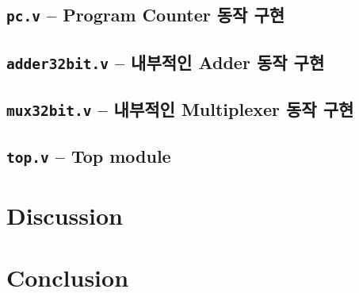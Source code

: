 \documentclass{scrartcl}
\begin{document}
\subsection{\texttt{pc.v} -- Program Counter 동작 구현}

\subsection{\texttt{adder32bit.v} -- 내부적인 Adder 동작 구현}

\subsection{\texttt{mux32bit.v} -- 내부적인 Multiplexer 동작 구현}

\subsection{\texttt{top.v} -- Top module}

\section{Discussion}

\section{Conclusion}
\end{document}

